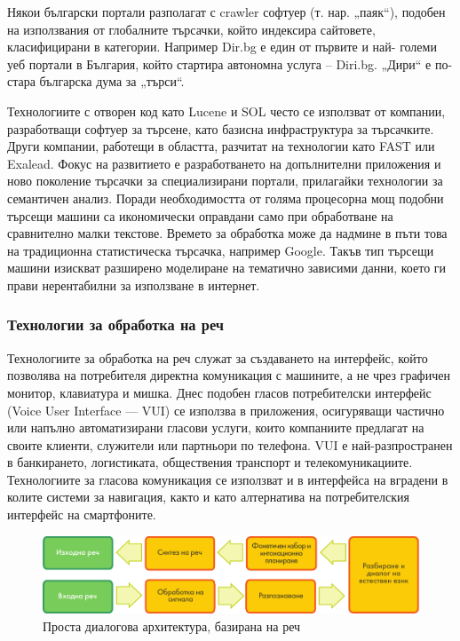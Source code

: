 \documentclass[]{../../metanetpaper}
\begin{document}
\begin{multicols}{2}
Някои български портали разполагат с crawler софтуер (т. нар.
 „паяк“), подобен на използвания от глобалните
 търсачки, който индексира сайтовете, класифицирани в
 категории. Например Dir.bg е един от първите и най-
големи уеб портали в България, който стартира
 автономна услуга – Diri.bg. „Дири“ е по-стара българска дума за „търси“. 

Технологиите с отворен код като
 Lucene и SOL често се използват от компании,
 разработващи софтуер за търсене, като базисна
 инфраструктура за търсачките. Други компании,
 работещи в областта, разчитат на технологии като FAST или Exalead.
Фокус на развитието е разработването на допълнителни приложения и ново поколение търсачки за специализирани портали, прилагайки технологии за семантичен анализ. Поради необходимостта от голяма процесорна мощ подобни търсещи машини са икономически оправдани само при обработване на сравнително малки текстове. Времето за обработка може да надмине в пъти това на традиционна статистическа търсачка, например Google. Такъв тип търсещи машини изискват разширено моделиране на тематично зависими данни, което ги прави нерентабилни за използване в интернет.

\subsubsection{Технологии за обработка на реч}

Технологиите за обработка на реч служат за създаването на интерфейс, който позволява на потребителя директна комуникация с машините, а не чрез графичен монитор, клавиатура и мишка. Днес подобен гласов
 потребителски интерфейс (Voice User Interface — VUI) се използва в приложения, осигуряващи частично или напълно
 автоматизирани гласови услуги, които компаниите предлагат на своите клиенти, служители или партньори
 по телефона. VUI е най-разпространен в банкирането, логистиката,
 обществения транспорт и телекомуникациите.
 Технологиите за гласова комуникация се използват и в интерфейса на вградени в колите системи за навигация, както и като алтернатива на потребителския
 интерфейс на смартфоните.

\begin{figure}[htb]
  \center  \includegraphics[width=\textwidth]{../_media/bulgarian/simple_speech-based_dialogue_architecture}
  \center
  \caption{Проста диалогова архитектура, базирана на реч}
  \label{fig:dialoguearch_de}
\end{figure}


\end{multicols}
\end{document}
